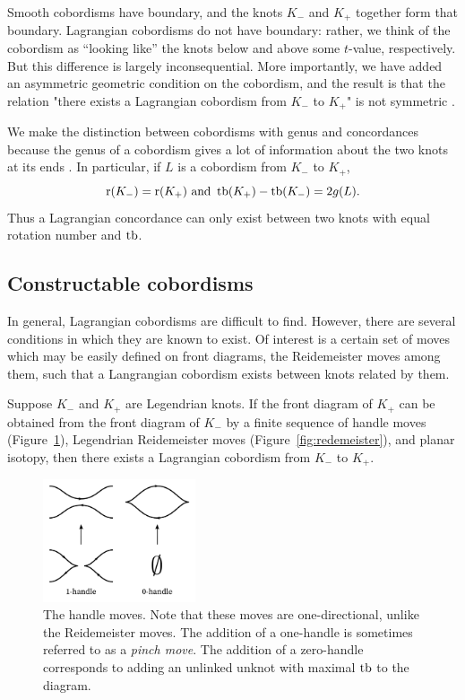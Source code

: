 Smooth cobordisms have boundary, and the knots $K_-$ and $K_+$ together form that boundary. Lagrangian cobordisms do not have boundary: rather, we think of the cobordism as ``looking like'' the knots below and above some $t$-value, respectively.
But this difference is largely inconsequential.
More importantly, we have added an asymmetric geometric condition on the cobordism, and the result is that the relation "there exists a Lagrangian cobordism from $K_-$ to $K_+$" is not symmetric \cite{chantraine2015}.

We make the distinction between cobordisms with genus and concordances because the genus of a cobordism gives a lot of information about the two knots at its ends \cite{chantraine2010}. In particular, if $L$ is a cobordism from $K_-$ to $K_+$,
\[
    \operatorname{r}(K_-) = \operatorname{r}(K_+) \text{     and     } \operatorname{tb}(K_+) - \operatorname{tb}(K_-) = 2g(L).
\]
Thus a Lagrangian concordance can only exist between two knots with equal rotation number and $\operatorname{tb}$.


\subsection{Constructable cobordisms}

In general, Lagrangian cobordisms are difficult to find. However, there are several conditions in which they are known to exist. Of interest is a certain set of moves which may be easily defined on front diagrams, the Reidemeister moves among them, such that a Langrangian cobordism exists between knots related by them.

\begin{theorem}
    Suppose $K_-$ and $K_+$ are Legendrian knots. If the front diagram of $K_+$ can be obtained from the front diagram of $K_-$ by a finite sequence of handle moves (Figure~\ref{fig:handles}), Legendrian Reidemeister moves (Figure~\ref{fig:redemeister}), and planar isotopy, then there exists a Lagrangian cobordism from $K_-$ to $K_+$. 
\end{theorem}
\begin{figure}[ht!]
    \centering
    \includegraphics[width=0.4\textwidth]{images/handles.pdf}
    \caption{The handle moves. Note that these moves are one-directional, unlike the Reidemeister moves. The addition of a one-handle is sometimes referred to as a \emph{pinch move}. The addition of a zero-handle corresponds to adding an unlinked unknot with maximal $\operatorname{tb}$ to the diagram.}
    \label{fig:handles}
\end{figure}

